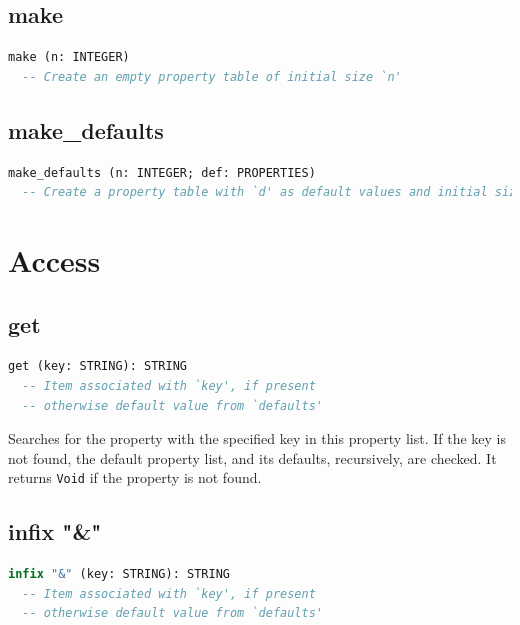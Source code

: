 \documentclass[a4paper,fleqn]{report}
\begin{document}
\subsection{make}
\label{sec:make}

\begin{lstlisting}[language=Eiffel]
make (n: INTEGER)
  -- Create an empty property table of initial size `n'
\end{lstlisting}


\subsection{make\_defaults}
\label{sec:make_defaults}

\begin{lstlisting}[language=Eiffel]
make_defaults (n: INTEGER; def: PROPERTIES)
  -- Create a property table with `d' as default values and initial size `n'
\end{lstlisting}


\section{Access}
\label{sec:access}


\subsection{get}
\label{sec:get}

\begin{lstlisting}[language=Eiffel]
get (key: STRING): STRING
  -- Item associated with `key', if present
  -- otherwise default value from `defaults'
\end{lstlisting}

Searches for the property with the specified key in this property
list. If the key is not found, the default property list, and its
defaults, recursively, are checked. It returns \texttt{Void} if the
property is not found.

\pagebreak

\subsection{infix "\&"}
\label{sec:infix_ampersand}

\begin{lstlisting}[language=Eiffel]
infix "&" (key: STRING): STRING
  -- Item associated with `key', if present
  -- otherwise default value from `defaults'
\end{lstlisting}
\end{document}
